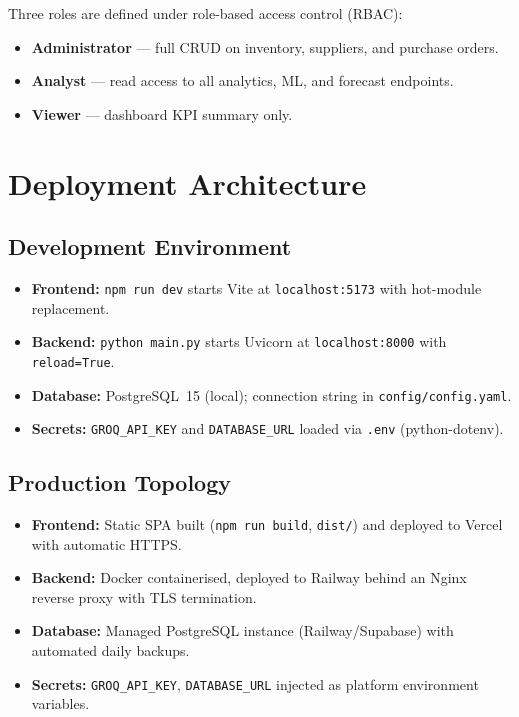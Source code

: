 \documentclass[conference]{IEEEtran}
\begin{document}
Three roles are defined under role-based access control (RBAC):
\begin{itemize}[noitemsep,topsep=2pt,leftmargin=*]
  \item \textbf{Administrator} — full CRUD on inventory, suppliers, and purchase orders.
  \item \textbf{Analyst} — read access to all analytics, ML, and forecast endpoints.
  \item \textbf{Viewer} — dashboard KPI summary only.
\end{itemize}

\section{Deployment Architecture}

\subsection{Development Environment}

\begin{itemize}[noitemsep,topsep=2pt,leftmargin=*]
  \item \textbf{Frontend:} \texttt{npm run dev} starts Vite at \texttt{localhost:5173}
        with hot-module replacement.
  \item \textbf{Backend:} \texttt{python main.py} starts Uvicorn at \texttt{localhost:8000}
        with \texttt{reload=True}.
  \item \textbf{Database:} PostgreSQL~15 (local); connection string in \texttt{config/config.yaml}.
  \item \textbf{Secrets:} \texttt{GROQ\_API\_KEY} and \texttt{DATABASE\_URL} loaded via
        \texttt{.env} (python-dotenv).
\end{itemize}

\subsection{Production Topology}

\begin{itemize}[noitemsep,topsep=2pt,leftmargin=*]
  \item \textbf{Frontend:} Static SPA built (\texttt{npm run build}, \texttt{dist/})
        and deployed to Vercel with automatic HTTPS.
  \item \textbf{Backend:} Docker containerised, deployed to Railway behind an Nginx
        reverse proxy with TLS termination.
  \item \textbf{Database:} Managed PostgreSQL instance (Railway/Supabase) with
        automated daily backups.
  \item \textbf{Secrets:} \texttt{GROQ\_API\_KEY}, \texttt{DATABASE\_URL} injected
        as platform environment variables.
\end{itemize}
\end{document}
